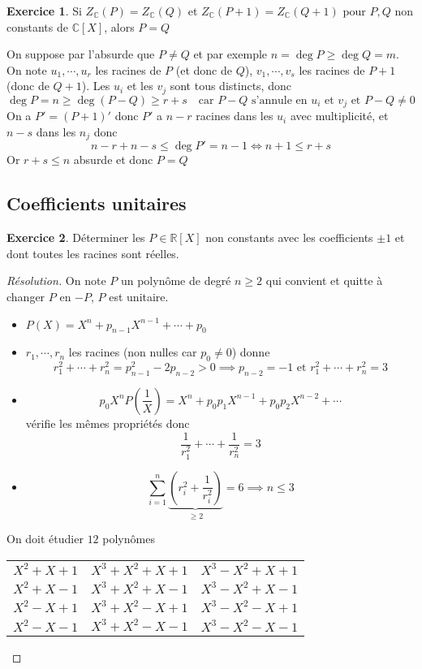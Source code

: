 \documentclass{article}
\theoremstyle{definition}
\newtheorem*{exo}{Exercice}
\begin{document}
\begin{exo}
    Si $Z_{\mathbb C}(P)=Z_{\mathbb C}(Q)$ et $Z_{\mathbb C}(P+1)=Z_{\mathbb C}(Q+1)$ pour $P,Q$ non constants de $\mathbb C[X]$, alors $P=Q$
\end{exo}

On suppose par l'absurde que $P\neq Q$ et par exemple $n=\deg P\geq \deg Q=m$. On note $u_1, \cdots, u_r$ les racines de $P$ (et donc de $Q$), $v_1, \cdots, v_s$ les racines de $P+1$ (donc de $Q+1$). Les $u_i$ et les $v_j$ sont tous distincts, donc \[
    \deg P=n\geq \deg(P-Q)\geq r+s \quad\text{car }P-Q\text{ s'annule en $u_i$ et $v_j$ et }P-Q\neq 0
\]
On a $P'=(P+1)'$ donc $P'$ a $n-r$ racines dans les $u_i$ avec multiplicité, et $n-s$ dans les $n_j$ donc \[
    n-r+n-s\leq \deg P'=n-1\iff n+1\leq r + s
\]
Or $r+s\leq n$ absurde et donc $P = Q$

\subsection{Coefficients unitaires}

\begin{exo}
    Déterminer les $P\in\mathbb R[X]$ non constants avec les coefficients $\pm1$ et dont toutes les racines sont réelles.
\end{exo}

\begin{proof}[Résolution]
    On note $P$ un polynôme de degré $n\geq 2$ qui convient et quitte à changer $P$ en $-P$, $P$ est unitaire.
    \begin{itemize}
        \item $P(X)=X^n+p_{n-1}X^{n-1}+\cdots +p_0$
        \item $r_1, \cdots, r_n$ les racines (non nulles car $p_0\neq 0$) donne \[
                r_1^2+\cdots +r_n^2=p_{n-1}^2-2p_{n-2}>0 \implies p_{n-2}=-1 \text{ et }r_1^2+\cdots+r_n^2=3
            \]
        \item \[
                p_0 X^n P \left( \frac1X \right)=X^n+p_0p_1X^{n-1}+p_0p_2X^{n-2}+\cdots
            \]
            vérifie les mêmes propriétés donc \[
                \frac 1{r_1^2} +\cdots +\frac1{r_n^2}=3
            \]

        \item \[
                \sum_{i=1}^n\underbrace{\left(r_i^2+\frac1{r_i^2}\right)}_{\geq 2}=6 \implies n\leq 3
            \]
    \end{itemize}
    On doit étudier $12$ polynômes
    \begin{center}
        \begin{tabular}{lll}
            \sout{$X^2+X+1$} & \sout{$X^3+X^2+X+1$} & \sout{$X^3-X^2+X+1$} \\
            $X^2+X-1$ & \sout{$X^3+X^2+X-1$} & \sout{$X^3-X^2+X-1$} \\
            \sout{$X^2-X+1$} & \sout{$X^3+X^2-X+1$} & $X^3-X^2-X+1$ \\
            $X^2-X-1$ & $X^3+X^2-X-1$ & \sout{$X^3-X^2-X-1$}
        \end{tabular}
    \end{center}
\end{proof}
\end{document}
